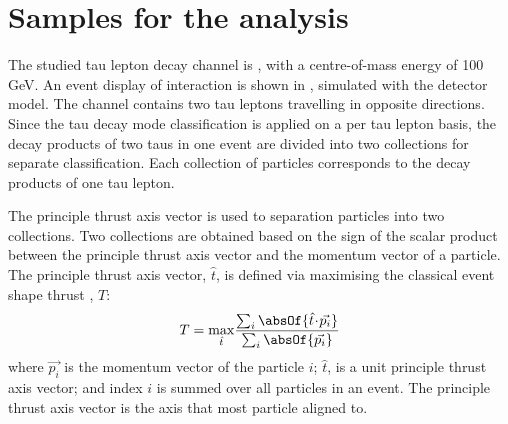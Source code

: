 \section{Samples for the analysis}
\label{sec:tauDecayModes}

The studied tau lepton decay channel is \eeToTauTau, with a centre-of-mass energy of 100\,GeV.  An event display of \eeToTauTau interaction is shown in , simulated with the \ILD detector model. The \eeToTauTau channel contains two tau leptons travelling in opposite directions. Since the tau decay mode classification is applied on a per tau lepton basis, the decay products of two taus in one event are divided into two collections for separate classification. Each collection of particles corresponds  to the decay products of one tau lepton.

The principle thrust axis vector is used to separation particles into two collections. Two collections are obtained based on the sign of the scalar product between the principle thrust axis vector  and the momentum vector of a particle. The principle thrust axis vector, $\hat{t}$, is defined via maximising the classical event shape thrust \cite{PhysRevLett.39.1587}, $T$:
\begin{equation}
T = \max_{\hat{t}}\!\frac{\sum_{i}\absOf{\hat{t}\!\cdot\!\vec{p_{i}}}}{\sum_{i}\absOf{\vec{p_{i}}}}
\end{equation}
where $\vec{p_{i}}$ is the momentum vector of the particle $i$;   $\hat{t}$, is a unit principle thrust axis vector; and index $i$ is summed over all particles in an event. The principle thrust axis vector is the axis that most particle aligned to.




